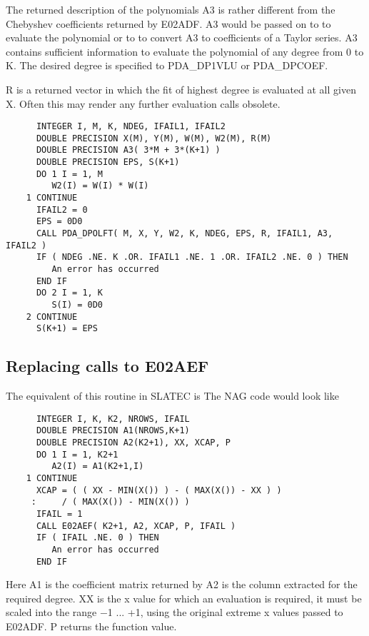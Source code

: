    The returned description of the polynomials A3 is rather different
   from the Chebyshev coefficients returned by E02ADF. A3 would be
   passed on to
   to evaluate the polynomial or to
   to
   convert A3 to coefficients of a Taylor series. A3 contains sufficient
   information to evaluate the polynomial of any degree from 0 to K. The
   desired degree is specified to PDA\_DP1VLU or PDA\_DPCOEF.

   R is a returned vector in which the fit of highest degree is
   evaluated at all given X. Often this may render any further
   evaluation calls obsolete.

\begin{verbatim}
      INTEGER I, M, K, NDEG, IFAIL1, IFAIL2
      DOUBLE PRECISION X(M), Y(M), W(M), W2(M), R(M)
      DOUBLE PRECISION A3( 3*M + 3*(K+1) )
      DOUBLE PRECISION EPS, S(K+1)
      DO 1 I = 1, M
         W2(I) = W(I) * W(I)
    1 CONTINUE
      IFAIL2 = 0
      EPS = 0D0
      CALL PDA_DPOLFT( M, X, Y, W2, K, NDEG, EPS, R, IFAIL1, A3, IFAIL2 )
      IF ( NDEG .NE. K .OR. IFAIL1 .NE. 1 .OR. IFAIL2 .NE. 0 ) THEN
         An error has occurred
      END IF
      DO 2 I = 1, K
         S(I) = 0D0
    2 CONTINUE
      S(K+1) = EPS
\end{verbatim}


\subsection{\label{m_e02aef}Replacing calls to E02AEF}

   The equivalent of this routine in SLATEC is
   The NAG code
   would look like

\begin{verbatim}
      INTEGER I, K, K2, NROWS, IFAIL
      DOUBLE PRECISION A1(NROWS,K+1)
      DOUBLE PRECISION A2(K2+1), XX, XCAP, P
      DO 1 I = 1, K2+1
         A2(I) = A1(K2+1,I)
    1 CONTINUE
      XCAP = ( ( XX - MIN(X()) ) - ( MAX(X()) - XX ) )
     :     / ( MAX(X()) - MIN(X()) )
      IFAIL = 1
      CALL E02AEF( K2+1, A2, XCAP, P, IFAIL )
      IF ( IFAIL .NE. 0 ) THEN
         An error has occurred
      END IF
\end{verbatim}

   Here A1 is the coefficient matrix returned by
   A2 is the
   column extracted for the required degree. XX is the x value for
   which an evaluation is required, it must be scaled into the range
   $-$1 ... +1, using the original extreme x values passed to E02ADF. P
   returns the function value.

